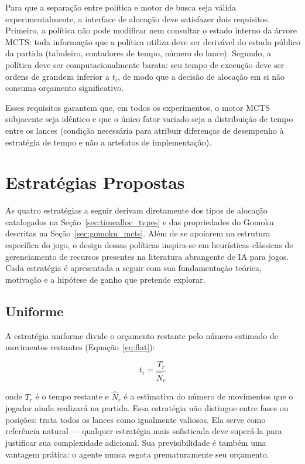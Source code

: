 \documentclass[cic,tc]{iiufrgs}
\begin{document}
Para que a separação entre política e motor de busca seja válida experimentalmente, a interface de alocação deve satisfazer dois requisitos. Primeiro, a política não pode modificar nem consultar o estado interno da árvore MCTS: toda informação que a política utiliza deve ser derivável do estado público da partida (tabuleiro, contadores de tempo, número do lance). Segundo, a política deve ser computacionalmente barata: seu tempo de execução deve ser ordens de grandeza inferior a $t_i$, de modo que a decisão de alocação em si não consuma orçamento significativo.

Esses requisitos garantem que, em todos os experimentos, o motor MCTS subjacente seja idêntico e que o único fator variado seja a distribuição de tempo entre os lances (condição necessária para atribuir diferenças de desempenho à estratégia de tempo e não a artefatos de implementação).

\section{Estratégias Propostas}
\label{sec:strategies}

As quatro estratégias a seguir derivam diretamente dos tipos de alocação catalogados na Seção~\ref{sec:timealloc_types} e das propriedades do Gomoku descritas na Seção~\ref{sec:gomoku_mcts}. Além de se apoiarem na estrutura específica do jogo, o design dessas políticas inspira-se em heurísticas clássicas de gerenciamento de recursos presentes na literatura abrangente de IA para jogos. Cada estratégia é apresentada a seguir com sua fundamentação teórica, motivação e a hipótese de ganho que pretende explorar.

\subsection{Uniforme}
\label{sec:strategy_flat}

A estratégia uniforme divide o orçamento restante pelo número estimado de movimentos restantes (Equação~\ref{eq:flat}):

\begin{equation}
    t_i = \frac{T_r}{\hat{N}_r}
\label{eq:flat}
\end{equation}

onde $T_r$ é o tempo restante e $\hat{N}_r$ é a estimativa do número de movimentos que o jogador ainda realizará na partida. Essa estratégia não distingue entre fases ou posições: trata todos os lances como igualmente valiosos. Ela serve como referência natural — qualquer estratégia mais sofisticada deve superá-la para justificar sua complexidade adicional. Sua previsibilidade é também uma vantagem prática: o agente nunca esgota prematuramente seu orçamento.
\end{document}
